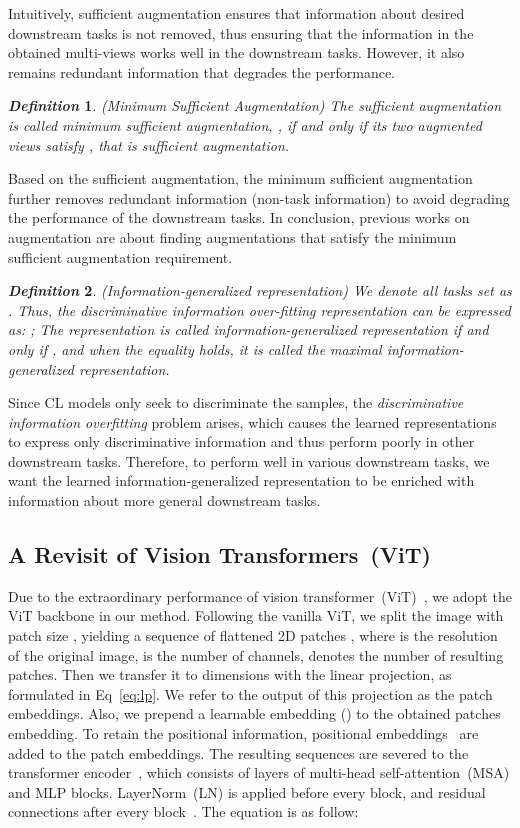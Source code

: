 \documentclass[10pt,twocolumn,letterpaper]{article}
\newtheorem{myDef}{\textit{Definition}}
\begin{document}
Intuitively, sufficient augmentation ensures that information about desired downstream tasks  is not removed, thus ensuring that the information in the obtained multi-views works well in the downstream tasks. However, it also remains redundant information that degrades the performance.

\begin{myDef}\label{min_suff_aug}
(Minimum Sufficient Augmentation) The sufficient augmentation is called minimum sufficient augmentation, , if and only if its two augmented views satisfy  ,  that is sufficient augmentation.
\end{myDef}

Based on the sufficient augmentation, the minimum sufficient augmentation further removes redundant information (non-task information) to avoid degrading the performance of the downstream tasks. In conclusion, previous works on augmentation are about finding augmentations that satisfy the minimum sufficient augmentation requirement.

\begin{myDef}\label{representation}
(Information-generalized representation) We denote all tasks set as . Thus, the discriminative information over-fitting representation  can be expressed as: ; The representation is called information-generalized representation  if and only if , and when the equality holds, it is called the maximal information-generalized representation.
\end{myDef}

Since CL models only seek to discriminate the samples, the \textit{discriminative information overfitting} problem arises, which causes the learned representations to express only discriminative information and thus perform poorly in other downstream tasks. Therefore, to perform well in various downstream tasks, we want the learned information-generalized representation to be enriched with information about more general downstream tasks.
\subsection{A Revisit of Vision Transformers~(ViT)}
Due to the extraordinary performance of vision transformer~(ViT)~\cite{dosovitskiy2020image}, we adopt the ViT backbone in our method. Following the vanilla ViT, we split the image  with patch size , yielding a sequence of flattened 2D patches , where  is the resolution of the original image,  is the number of channels,  denotes the number of resulting patches. Then we transfer it to  dimensions with the linear projection, as formulated in Eq~\ref{eq:lp}. We refer to the output of this projection as the patch embeddings. Also, we prepend a learnable embedding () to the obtained patches embedding. To retain the positional information, positional embeddings~ are added to the patch embeddings. The resulting sequences are severed to the transformer encoder~\cite{vaswani2017attention}, which consists of  layers of multi-head self-attention~(MSA) and MLP blocks. LayerNorm~(LN) is applied before every block, and residual connections after every block~\cite{baevski2018adaptive,wang2019learning}. The equation is as follow:
\end{document}
